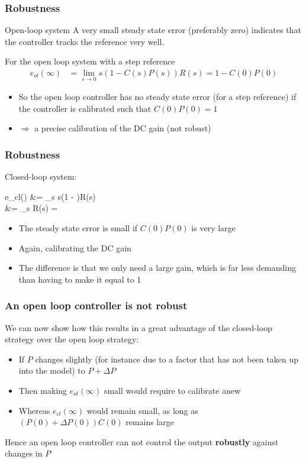 \begin{frame}
	\frametitle{Robustness}
	\begin{block}{Open-loop system}
		A very small steady state error (preferably zero) indicates that the controller tracks the reference very well.
		
		For the open loop system with a step reference
		\begin{align*}
			e_{ol}(\infty) &= \lim\limits_{s \rightarrow 0}
			s(1 - C(s)P(s))R(s) = 1 - C(0)P(0)
		\end{align*}
		\vspace{-1em}
		\begin{itemize}
			\item So the open loop controller has no steady state error (for a step reference) if the controller is calibrated such that $C(0)P(0)=1$
			\item $\Rightarrow$ a precise calibration of the DC gain (not robust)
		\end{itemize}
	\end{block}
\end{frame}


\begin{frame}
	\frametitle{Robustness}
	\begin{block}{Closed-loop system:}
		\begin{flalign*}
			e_{cl}(\infty) &= \lim\limits_{s } s\left(1 - \right)R(s) \\
			&= \lim\limits_{s } R(s) = 
		\end{flalign*}
		\begin{itemize}
			\item The steady state error is small if $C(0)P(0)$ is very large
			\item Again, calibrating the DC gain
			\item The difference is that we only need a large gain, which is far less demanding than having to make it equal to 1
		\end{itemize}
	\end{block}
\end{frame}

\begin{frame}
	\frametitle{An open loop controller is not robust}
	\begin{block}{}
		We can now show how this results in a great advantage of the closed-loop strategy over the open loop strategy:
		\begin{itemize}
			\item If $P$ changes slightly (for instance due to a factor that has not been taken up into the model) to $P+\Delta P$
			\item Then making $e_{ol}(\infty)$ small would require to calibrate anew
			\item Whereas $e_{cl} (\infty)$ would remain small, as long as $(P(0)+\Delta P(0))C(0)$ remains large
			
		\end{itemize}
		Hence an open loop controller can not control the output \textbf{robustly} against changes in $P$
	\end{block}
\end{frame}

